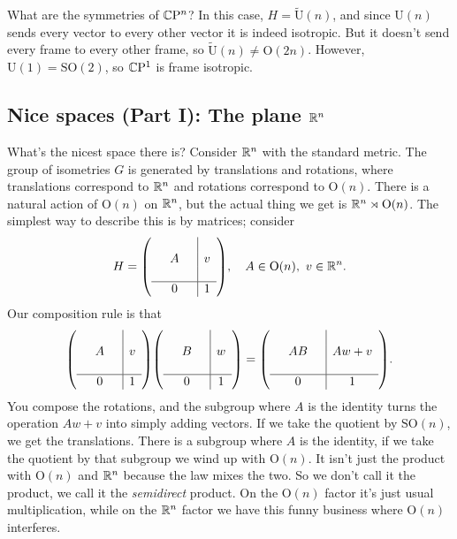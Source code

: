 \begin{example}
     What are the symmetries of $\mathbb{C} \mathrm P^n $? In this case, $H=\widetilde {\mathrm U}(n)$, and since  $\mathrm U(n)$ sends every vector to every other vector it is indeed isotropic. But it doesn't send every frame to every other frame, so $\widetilde {\mathrm U} (n)\neq \mathrm O(2n)$. However, $\mathrm U(1)=\mathrm { SO} (2)$, so $\mathbb{C}\mathrm P^1$ is frame isotropic.
\end{example}

\subsection{Nice spaces (Part I): The plane $\mathbb{R}^n $}
What's the nicest space there is? Consider $\mathbb{R}^n $ with the standard metric. The group of isometries $G$ is generated by translations and rotations, where translations correspond to $\mathbb{R}^n $ and rotations correspond to $\mathrm O(n)$. There is a natural action of $\mathrm O(n) $ on $\mathbb{R}^n $, but the actual thing we get is $\mathbb{R}^n \rtimes \mathrm O(n) $. The simplest way to describe this is by matrices; consider \[
    H= 
\mleft(\begin{array}{ccc|c}
    & & &  \\
    & A & &v \\
    & & &  \\
    \hline
    & 0 & &  1
\end{array}\mright) ,\quad A \in \mathrm O(n),\ v \in \R^n.
    \] Our composition rule is that \[
    \mleft(\begin{array}{ccc|c}
    & & &  \\
    & A & &v \\
    & & &  \\
    \hline
    & 0 & &  1
\end{array}\mright)
\mleft(\begin{array}{ccc|c}
    & & &  \\
    & B & &w \\
    & & &  \\
    \hline
    & 0 & &  1
\end{array}\mright)=
\mleft(\begin{array}{ccc|c}
    & & &  \\
    & AB & &Aw+v \\
    & & &  \\
    \hline
    & 0 & &  1
\end{array}\mright).
    \] You compose the rotations, and the subgroup where $A$ is the identity turns the operation $Aw+v$ into simply adding vectors. If we take the quotient by $\mathrm {SO} (n)$, we get the translations. There is a subgroup where $A$ is the identity, if we take the quotient by that subgroup we wind up with $\mathrm O(n)$. It isn't just the product with $\mathrm O(n)$ and $\mathbb{R}^n $ because the law mixes the two. So we don't call it the product, we call it the \emph{semidirect} product. On the $\mathrm O(n)$ factor it's just usual multiplication, while on the $\mathbb{R}^n $ factor we have this funny business where $\mathrm O(n)$ interferes.

